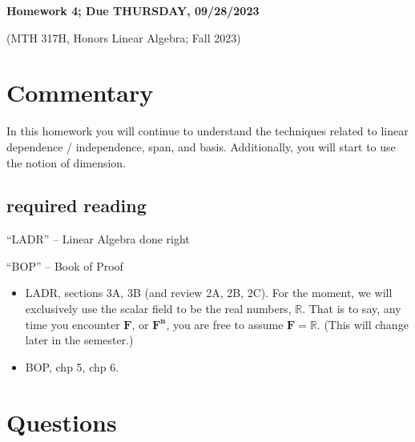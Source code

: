 \documentclass[12pt]{article}
\def\real{{\mathbb R}}
\begin{document}
	\begin{LARGE}
	\begin{center}
		
	
	\textbf{Homework 4; Due THURSDAY, 09/28/2023}
	

	(MTH 317H, Honors Linear Algebra;  Fall 2023)
	\end{center}
	\end{LARGE}
	\vspace{0.15in}
	
	

\section{Commentary}

In this homework you will continue to understand the techniques related to linear dependence / independence, span, and basis.  Additionally, you will start to use the notion of dimension.



\subsection{required reading}


\noindent
``LADR'' -- Linear Algebra done right



\noindent
``BOP'' -- Book of Proof

\begin{itemize}
	\item LADR, sections  3A, 3B (and review 2A, 2B, 2C).  For the moment, we will exclusively use the scalar field to be the real numbers, $\real$.  That is to say, any time you encounter $\mathbf{F}$, or $\mathbf{F^n}$, you are free to assume $\mathbf{F}=\real$.  (This will change later in the semester.)
	
	
	\item BOP, chp 5, chp 6.
\end{itemize}





\section{Questions}
\end{document}
